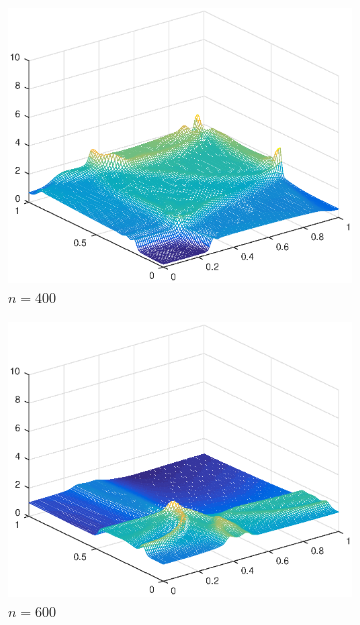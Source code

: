 \begin{figure}[h!]
    \begin{subfigure}[t]{0.48\textwidth}
        \centering
        \includegraphics[width=\textwidth]{images/sol_ri_0400cf.eps}
        \caption{$n=400$}
        \label{fig:50}
    \end{subfigure}
    \begin{subfigure}[t]{0.48\textwidth}
        \centering
        \includegraphics[width=\textwidth]{images/sol_ri_0600cf.eps}
        \caption{$n=600$}
        \label{fig:100}
    \end{subfigure}
    \begin{subfigure}[t]{0.48\textwidth}

\end{subfigure}
\end{figure}

